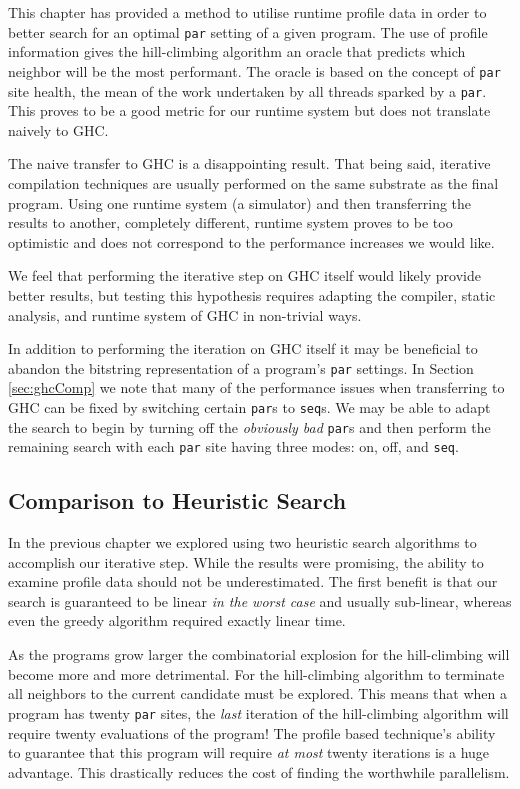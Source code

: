 This chapter has provided a method to utilise runtime profile data in order to
better search for an optimal \verb|par| setting of a given program. The use
of profile information gives the hill-climbing algorithm an oracle that
predicts which neighbor will be the most performant. The oracle is based
on the concept of \verb|par| site health, the mean of the work undertaken
by all threads sparked by a \verb|par|. This proves to be a good metric
for our runtime system but does not translate naively to GHC.

The naive transfer to GHC is a disappointing result. That being said, iterative
compilation techniques are usually performed on the same substrate as the final
program. Using one runtime system (a simulator) and then transferring the
results to another, completely different, runtime system proves to be too
optimistic and does not correspond to the performance increases we would like.

We feel that performing the iterative step on GHC itself would likely
provide better results, but testing this hypothesis requires adapting the
compiler, static analysis, and runtime system of GHC in non-trivial ways.

In addition to performing the iteration on GHC itself it may be beneficial to
abandon the bitstring representation of a program's \verb|par| settings. In
Section \ref{sec:ghcComp} we note that many of the performance issues when
transferring to GHC can be fixed by switching certain \verb|par|s to
\verb|seq|s. We may be able to adapt the search to begin by turning off the
\emph{obviously bad} \verb|par|s and then perform the remaining search with
each \verb|par| site having three modes: on, off, and \verb|seq|.

\subsection{Comparison to Heuristic Search}

In the previous chapter we explored using two heuristic search algorithms to
accomplish our iterative step. While the results were promising, the ability to
examine profile data should not be underestimated. The first benefit is that
our search is guaranteed to be linear \emph{in the worst case} and usually
sub-linear, whereas even the greedy algorithm required exactly linear time.

As the programs grow larger the combinatorial explosion for the hill-climbing
will become more and more detrimental. For the hill-climbing algorithm to
terminate all neighbors to the current candidate must be explored. This means
that when a program has twenty \verb|par| sites, the \emph{last} iteration of
the hill-climbing algorithm will require twenty evaluations of the program! The
profile based technique's ability to guarantee that this program will require
\emph{at most} twenty iterations is a huge advantage. This drastically reduces
the cost of finding the worthwhile parallelism.
